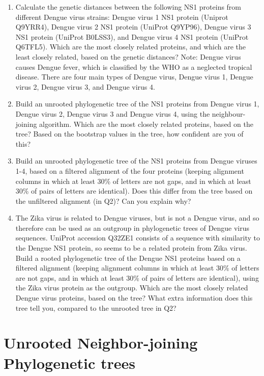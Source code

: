 \documentclass[
]{book}
\providecommand{\tightlist}{%
  \setlength{\itemsep}{0pt}\setlength{\parskip}{0pt}}
\begin{document}
\begin{enumerate}
\def\labelenumi{\arabic{enumi}.}
\tightlist
\item
  Calculate the genetic distances between the following NS1 proteins from different Dengue virus strains: Dengue virus 1 NS1 protein (Uniprot Q9YRR4), Dengue virus 2 NS1 protein (UniProt Q9YP96), Dengue virus 3 NS1 protein (UniProt B0LSS3), and Dengue virus 4 NS1 protein (UniProt Q6TFL5). Which are the most closely related proteins, and which are the least closely related, based on the genetic distances?
  Note: Dengue virus causes Dengue fever, which is classified by the WHO as a neglected tropical disease. There are four main types of Dengue virus, Dengue virus 1, Dengue virus 2, Dengue virus 3, and Dengue virus 4.
\item
  Build an unrooted phylogenetic tree of the NS1 proteins from Dengue virus 1, Dengue virus 2, Dengue virus 3 and Dengue virus 4, using the neighbour-joining algorithm. Which are the most closely related proteins, based on the tree? Based on the bootstrap values in the tree, how confident are you of this?
\item
  Build an unrooted phylogenetic tree of the NS1 proteins from Dengue viruses 1-4, based on a filtered alignment of the four proteins (keeping alignment columns in which at least 30\% of letters are not gaps, and in which at least 30\% of pairs of letters are identical). Does this differ from the tree based on the unfiltered alignment (in Q2)? Can you explain why?
\item
  The Zika virus is related to Dengue viruses, but is not a Dengue virus, and so therefore can be used as an outgroup in phylogenetic trees of Dengue virus sequences. UniProt accession Q32ZE1 consists of a sequence with similarity to the Dengue NS1 protein, so seems to be a related protein from Zika virus. Build a rooted phylogenetic tree of the Dengue NS1 proteins based on a filtered alignment (keeping alignment columns in which at least 30\% of letters are not gaps, and in which at least 30\% of pairs of letters are identical), using the Zika virus protein as the outgroup. Which are the most closely related Dengue virus proteins, based on the tree? What extra information does this tree tell you, compared to the unrooted tree in Q2?
\end{enumerate}

\hypertarget{unrooted-neighbor-joining-phylogenetic-trees}{%
\chapter{Unrooted Neighbor-joining Phylogenetic trees}\label{unrooted-neighbor-joining-phylogenetic-trees}}
\end{document}
